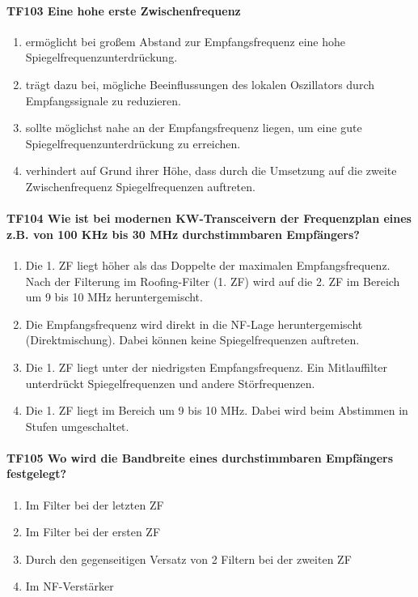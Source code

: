\documentclass[8pt]{article}
\begin{document}
\begin{enumerate}
\paragraph*{TF103 Eine hohe erste Zwischenfrequenz}
\begin{enumerate}[nolistsep,label=\Alph*]
\item ermöglicht bei großem Abstand zur Empfangsfrequenz eine hohe Spiegelfrequenzunterdrückung.
\item trägt dazu bei, mögliche Beeinflussungen des lokalen Oszillators durch Empfangssignale zu reduzieren.
\item sollte möglichst nahe an der Empfangsfrequenz liegen, um eine gute Spiegelfrequenzunterdrückung zu erreichen.
\item verhindert auf Grund ihrer Höhe, dass durch die Umsetzung auf die zweite Zwischenfrequenz Spiegelfrequenzen auftreten.
\end{enumerate}

\paragraph*{TF104 Wie ist bei modernen KW-Transceivern der Frequenzplan eines z.B. von 100 KHz bis 30 MHz durchstimmbaren Empfängers?}
\begin{enumerate}[nolistsep,label=\Alph*]
\item Die 1. ZF liegt höher als das Doppelte der maximalen Empfangsfrequenz. Nach der Filterung im Roofing-Filter (1. ZF) wird auf die 2. ZF im Bereich um 9 bis 10 MHz heruntergemischt.
\item Die Empfangsfrequenz wird direkt in die NF-Lage heruntergemischt (Direktmischung). Dabei können keine Spiegelfrequenzen auftreten.
\item Die 1. ZF liegt unter der niedrigsten Empfangsfrequenz. Ein Mitlauffilter unterdrückt Spiegelfrequenzen und andere Störfrequenzen.
\item Die 1. ZF liegt im Bereich um 9 bis 10 MHz. Dabei wird beim Abstimmen in Stufen umgeschaltet.
\end{enumerate}

\paragraph*{TF105 Wo wird die Bandbreite eines durchstimmbaren Empfängers festgelegt?}
\begin{enumerate}[nolistsep,label=\Alph*]
\item Im Filter bei der letzten ZF
\item Im Filter bei der ersten ZF
\item Durch den gegenseitigen Versatz von 2 Filtern bei der zweiten ZF
\item Im NF-Verstärker
\end{enumerate}


\end{enumerate}
\end{document}
